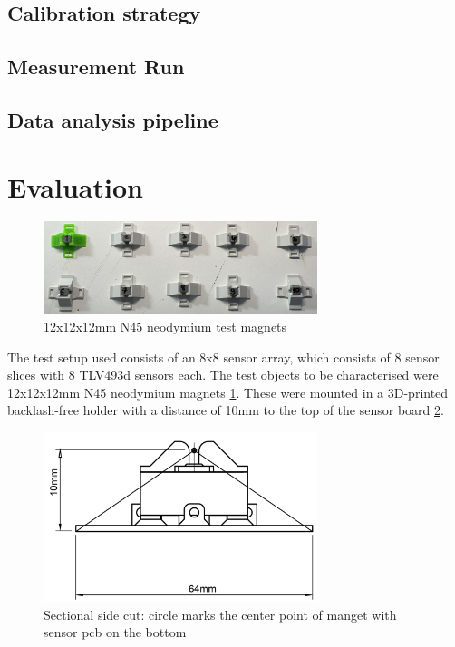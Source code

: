\documentclass[conference]{IEEEtran}
\begin{document}
\subsection{Calibration strategy \label{ref_calib}}



\subsection{Measurement Run}


\subsection{Data analysis pipeline}












\section{Evaluation}

\begin{figure}[htbp]
\centerline{\includegraphics[width=8cm]{magnets_with_holder.jpg}}
\caption{12x12x12mm N45 neodymium test magnets }
\label{mag_with_holder_fig}
\end{figure}

The test setup used consists of an 8x8 sensor array, which consists of 8 sensor slices with 8 TLV493d sensors each.
The test objects to be characterised were 12x12x12mm N45 neodymium magnets \ref{mag_with_holder_fig}.
These were mounted in a 3D-printed backlash-free holder with a distance of 10mm to the top of the sensor board \ref{mag_pcb_side_cut_fig}.


\begin{figure}[htbp]
\centerline{\includegraphics[width=8cm]{magnet_pcb_drawing.png}}
\caption{Sectional side cut: circle marks the center point of manget with sensor pcb on the bottom}
\label{mag_pcb_side_cut_fig}
\end{figure}
\end{document}
